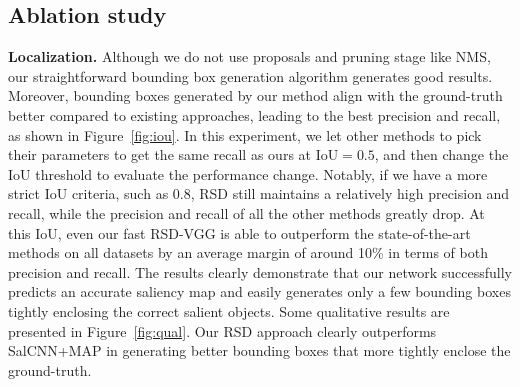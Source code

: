 \documentclass[10pt,twocolumn,letterpaper]{article}
\begin{document}
\subsection{Ablation study}
{\flushleft \textbf{Localization.}} Although we do not use proposals and pruning stage like NMS, our straightforward bounding box generation algorithm generates good results. Moreover, bounding boxes generated by our method align with the ground-truth better compared to existing approaches, leading to the best precision and recall, as shown in Figure~\ref{fig:iou}.
In this experiment, we let other methods to pick their parameters to get the same recall as ours at IoU$=0.5$, and then change the IoU threshold to evaluate the performance change. 
Notably, if we have a more strict IoU criteria, such as 0.8, RSD still maintains a relatively high precision and recall, while the precision and recall of all the other methods greatly drop. At this IoU, even our fast RSD-VGG is able to outperform the state-of-the-art methods on all datasets by an average margin of around 10\% in terms of both precision and recall. The results clearly demonstrate that our network successfully predicts an accurate saliency map and easily generates only a few bounding boxes tightly enclosing the correct salient objects. Some qualitative results are presented in Figure~\ref{fig:qual}. Our RSD approach clearly outperforms SalCNN+MAP in generating better bounding boxes that more tightly enclose the ground-truth.
\end{document}
